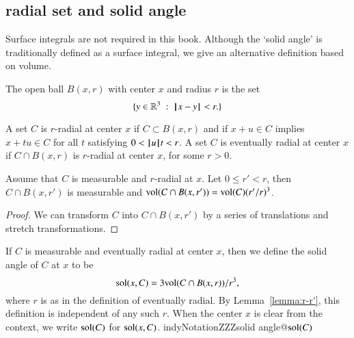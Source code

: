 \subsection{radial set and solid angle}\label{sec:solid}

Surface integrals are not required in this book.  Although
the `solid angle' is traditionally defined as a surface integral,
we give an alternative definition based on volume.


\begin{definition}  The open ball $B(x,r)$ with center $x$ and
radius $r$ is the set
    $$
    \{ y\in\mathbb{R}^3 \ :\  {\hskip0.1em|\hskip-0.15em|\hskip0.1em}x - y{\hskip0.1em|\hskip-0.15em|\hskip0.1em} < r.\}
    $$
\end{definition}



\begin{definition}[radial]
    A set $C$ is $r$-radial at center $x$ if  $C\subset B(x,r)$
    and if
        $x + u \in C$ implies
        $x + t u \in C$ for all $t$ satisfying $0 < {{\hskip0.1em|\hskip-0.15em|\hskip0.1em}u{\hskip0.1em|\hskip-0.15em|\hskip0.1em}} t < r$.
A set $C$ is eventually radial at center $x$ if $C\cap B(x,r)$ is
$r$-radial at center $x$, for some $r>0$.
\end{definition}

\begin{lemma}
Assume that $C$ is measurable and $r$-radial at $x$.  Let $0\le r'<r$,
then $C\cap B(x,r')$ is measurable and
${\operatorname{vol}}(C\cap B(x,r')) = {\operatorname{vol}}(C) (r'/r)^3$.
\end{lemma}

\begin{proof}  We can transform $C$ into $C\cap B(x,r')$ by
a series of translations and stretch transformations.
\end{proof}


\begin{definition}
If $C$ is measurable and eventually radial at center $x$, then we
define the solid angle of $C$ at $x$ to be
    $$
    {\operatorname{sol}}(x,C) = 3 {\operatorname{vol}}(C\cap B(x,r))/r^3,
    $$
where $r$ is as in the definition of eventually radial. 
By Lemma~\ref{lemma:r-r'}, this
definition is independent of any such $r$.  When the center $x$ is
clear from the context, we write ${\operatorname{sol}}(C)$ for
${\operatorname{sol}}(x,C)$.
indy{Notation}{ZZZsolid angle@${\operatorname{sol}}(C)$}
\end{definition}



